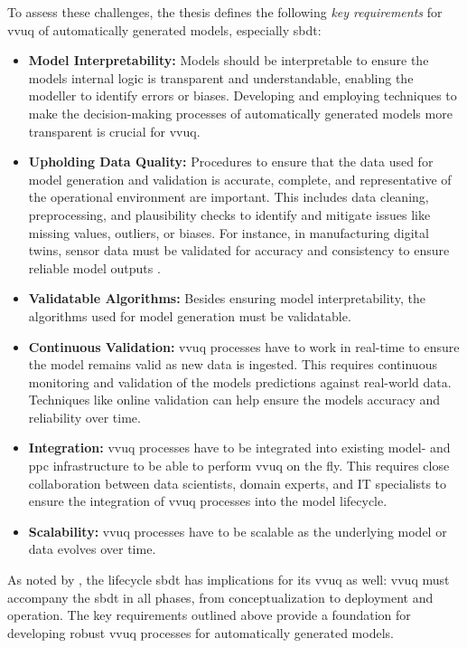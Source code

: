 To assess these challenges, the thesis defines the following \textit{key requirements} for \gls{vvuq} of automatically generated models, especially \gls{sbdt}:
\begin{itemize}
  \label{par:key-requirements}
  \item \textbf{Model Interpretability:} \label{par:surrogate} Models should be interpretable to ensure the models internal logic is transparent and understandable, enabling the modeller to identify errors or biases. Developing and employing techniques to make the decision-making processes of automatically generated models more transparent is crucial for \gls{vvuq}.
  \item \textbf{Upholding Data Quality:} Procedures to ensure that the data used for model generation and validation is accurate, complete, and representative of the operational environment are important. This includes data cleaning, preprocessing, and plausibility checks to identify and mitigate issues like missing values, outliers, or biases. For instance, in manufacturing digital twins, sensor data must be validated for accuracy and consistency to ensure reliable model outputs \autocite{rodriguez2023updating}.
  \item \textbf{Validatable Algorithms:} Besides ensuring model interpretability, the algorithms used for model generation must be validatable.
  \item \textbf{Continuous Validation:} \gls{vvuq} processes have to work in real-time to ensure the model remains valid as new data is ingested. This requires continuous monitoring and validation of the models predictions against real-world data. Techniques like online validation \autocite{francis2021towards} can help ensure the models accuracy and reliability over time.
  \item \textbf{Integration:} \gls{vvuq} processes have to be integrated into existing model- and \gls{ppc} infrastructure to be able to perform \gls{vvuq} on the fly. This requires close collaboration between data scientists, domain experts, and IT specialists to ensure the integration of \gls{vvuq} processes into the model lifecycle.
  \item \textbf{Scalability:} \gls{vvuq} processes have to be scalable as the underlying model or data evolves over time.
\end{itemize}

As noted by \textcite{francis2021towards}, the lifecycle \gls{sbdt} has implications for its \gls{vvuq} as well: \gls{vvuq} must accompany the \gls{sbdt} in all phases, from conceptualization to deployment and operation. The key requirements outlined above provide a foundation for developing robust \gls{vvuq} processes for automatically generated models.

